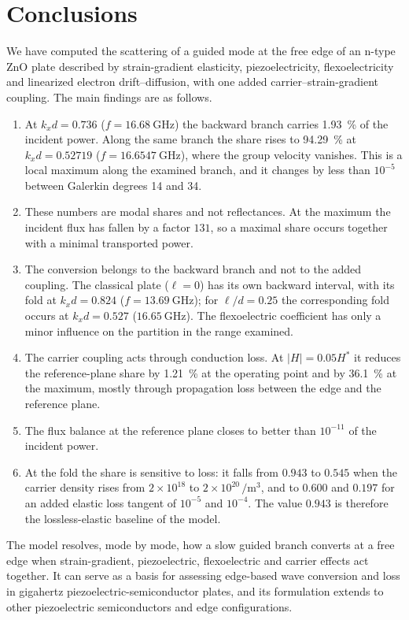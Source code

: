 \section{Conclusions}
\label{sec:conclusions}

We have computed the scattering of a guided mode at the free edge of an n-type ZnO plate described by strain-gradient elasticity, piezoelectricity, flexoelectricity and linearized electron drift--diffusion, with one added carrier--strain-gradient coupling.  The main findings are as follows.

\begin{enumerate}
\item At $k_xd=0.736$ ($f=\SI{16.68}{\giga\hertz}$) the backward branch carries \SI{1.93}{\percent} of the incident power.  Along the same branch the share rises to \SI{94.29}{\percent} at $k_xd=0.52719$ ($f=\SI{16.6547}{\giga\hertz}$), where the group velocity vanishes.  This is a local maximum along the examined branch, and it changes by less than $10^{-5}$ between Galerkin degrees 14 and 34.
\item These numbers are modal shares and not reflectances.  At the maximum the incident flux has fallen by a factor $131$, so a maximal share occurs together with a minimal transported power.
\item The conversion belongs to the backward branch and not to the added coupling.  The classical plate ($\ell=0$) has its own backward interval, with its fold at $k_xd=0.824$ ($f=\SI{13.69}{\giga\hertz}$); for $\ell/d=0.25$ the corresponding fold occurs at $k_xd=0.527$ ($\SI{16.65}{\giga\hertz}$).  The flexoelectric coefficient has only a minor influence on the partition in the range examined.
\item The carrier coupling acts through conduction loss.  At $|H|=0.05H^{*}$ it reduces the reference-plane share by \SI{1.21}{\percent} at the operating point and by \SI{36.1}{\percent} at the maximum, mostly through propagation loss between the edge and the reference plane.
\item The flux balance at the reference plane closes to better than $10^{-11}$ of the incident power.
\item At the fold the share is sensitive to loss: it falls from $0.943$ to $0.545$ when the carrier density rises from $2\times10^{18}$ to $2\times10^{20}\,\si{\per\cubic\metre}$, and to $0.600$ and $0.197$ for an added elastic loss tangent of $10^{-5}$ and $10^{-4}$.  The value $0.943$ is therefore the lossless-elastic baseline of the model.
\end{enumerate}

The model resolves, mode by mode, how a slow guided branch converts at a free edge when strain-gradient, piezoelectric, flexoelectric and carrier effects act together.  It can serve as a basis for assessing edge-based wave conversion and loss in gigahertz piezoelectric-semiconductor plates, and its formulation extends to other piezoelectric semiconductors and edge configurations.
